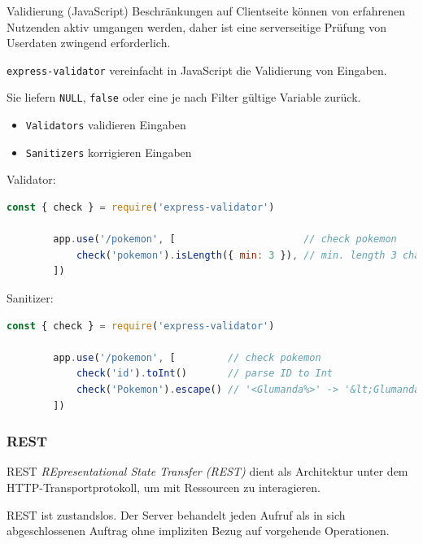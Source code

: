 \begin{defi}{Validierung (JavaScript)}
    Beschränkungen auf Clientseite können von erfahrenen Nutzenden aktiv umgangen werden, daher ist eine serverseitige Prüfung von Userdaten zwingend erforderlich.

    \texttt{express-validator} vereinfacht in JavaScript die Validierung von Eingaben.

    Sie liefern \texttt{NULL}, \texttt{false} oder eine je nach Filter gültige Variable zurück.

    \begin{itemize}
        \item \texttt{Validators} validieren Eingaben
        \item \texttt{Sanitizers} korrigieren Eingaben
    \end{itemize}

    Validator:
    \begin{lstlisting}[language=JavaScript]
        const { check } = require('express-validator')

        app.use('/pokemon', [                      // check pokemon
            check('pokemon').isLength({ min: 3 }), // min. length 3 chars (z. B. Mew)
        ])
    \end{lstlisting}

    Sanitizer:
    \begin{lstlisting}[language=JavaScript]
        const { check } = require('express-validator')

        app.use('/pokemon', [         // check pokemon
            check('id').toInt()       // parse ID to Int
            check('Pokemon').escape() // '<Glumanda%>' -> '&lt;Glumanda%&gt;'
        ])
    \end{lstlisting}
\end{defi}

\subsubsection{REST}

\begin{defi}{REST}
    \emph{REpresentational State Transfer (REST)} dient als Architektur unter dem HTTP-Transportprotokoll, um mit Ressourcen zu interagieren.

    REST ist zustandslos.
    Der Server behandelt jeden Aufruf als in sich abgeschlossenen Auftrag ohne impliziten Bezug auf vorgehende Operationen.
\end{defi}

